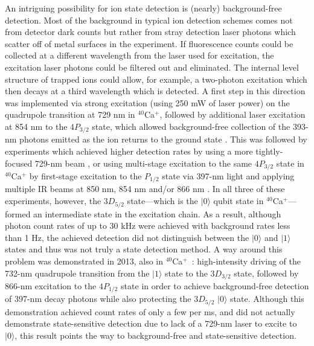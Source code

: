 \documentclass[%
reprint,
 amsmath,amssymb,
]{revtex4-1}
\newcommand{\zero}{|0 \rangle}
\newcommand{\one}{|1 \rangle}
\begin{document}
An intriguing possibility for ion state detection is (nearly) background-free detection. Most of the background in typical ion detection schemes comes not from detector dark counts but rather from stray detection laser photons which scatter off of metal surfaces in the experiment. If fluorescence counts could be collected at a different wavelength from the laser used for excitation, the excitation laser photons could be filtered out and eliminated. The internal level structure of trapped ions could allow, for example, a two-photon excitation which then decays at a third wavelength which is detected. A first step in this direction was implemented via strong excitation (using 250 mW of laser power) on the quadrupole transition at 729 nm in $^{40}$Ca$^+$, followed by additional laser excitation at 854 nm to the $4P_{3/2}$ state, which allowed background-free collection of the 393-nm photons emitted as the ion returns to the ground state \cite{HendricksIonBlaster2008}. This was followed by experiments which achieved higher detection rates by using a more tightly-focused 729-nm beam \cite{LindenfelserBackgroundFree2017},  or using multi-stage excitation to the same $4P_{3/2}$ state in $^{40}$Ca$^+$ by first-stage excitation to the $P_{1/2}$ state via 397-nm light and applying multiple IR beams at 850 nm, 854 nm and/or 866 nm \cite{LinkeBackgroundFree2012}. In all three of these experiments, however, the $3D_{5/2}$ state---which is the $\zero$ qubit state in $^{40}$Ca$^+$---formed an intermediate state in the excitation chain. As a result, although photon count rates of up to 30 kHz were achieved with background rates less than 1 Hz, the achieved detection did not distinguish between the $\zero$ and $\one$ states and thus was not truly a state detection method. A way around this problem was demonstrated in 2013, also in $^{40}$Ca$^+$~\cite{FeiBackgroundFree2013}: high-intensity driving of the 732-nm quadrupole transition from the $\one$ state to the $3D_{3/2}$ state, followed by 866-nm excitation to the $4P_{1/2}$ state in order to achieve background-free detection of 397-nm decay photons while also protecting the $3D_{5/2}$ $\zero$ state. Although this demonstration achieved count rates of only a few per ms, and did not actually demonstrate state-sensitive detection due to lack of a 729-nm laser to excite to $\zero$, this result points the way to background-free and state-sensitive detection.
\end{document}
